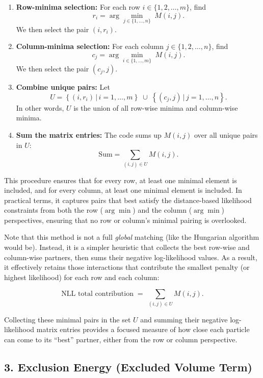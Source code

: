 \documentclass[12pt]{article}
\begin{document}
\begin{enumerate}
    \item \textbf{Row-minima selection:} For each row \(i \in \{1,2,\ldots,m\}\), find 
    \[
    r_i = \arg\min_{j \in \{1,\ldots,n\}} \; M(i,j).
    \]
    We then select the pair \((i, r_i)\).

    \item \textbf{Column-minima selection:} For each column \(j \in \{1,2,\ldots,n\}\), find 
    \[
    c_j = \arg\min_{i \in \{1,\ldots,m\}} \; M(i,j).
    \]
    We then select the pair \((c_j, j)\).

    \item \textbf{Combine unique pairs:} Let 
    \[
    U = \left\{(i, r_i)\,\big\vert\, i = 1,\ldots,m\right\} \;\cup\; 
         \left\{(c_j, j)\,\big\vert\, j = 1,\ldots,n\right\}.
    \]
    In other words, \(U\) is the union of all row-wise minima and column-wise minima.

    \item \textbf{Sum the matrix entries:} The code sums up \(M(i,j)\) over all unique pairs in \(U\):
    \[
    \text{Sum} = \sum_{(i,j) \in U} M(i,j).
    \]
\end{enumerate}

This procedure ensures that for every row, at least one minimal element is included, and for every column, at least one minimal element is included. In practical terms, it captures pairs that best satisfy the distance-based likelihood constraints from both the row (\(\arg\min\)) and the column (\(\arg\min\)) perspectives, ensuring that no row or column's minimal pairing is overlooked.

Note that this method is not a full \emph{global} matching (like the Hungarian algorithm would be). Instead, it is a simpler heuristic that collects the best row-wise and column-wise partners, then sums their negative log-likelihood values. As a result, it effectively retains those interactions that contribute the smallest penalty (or highest likelihood) for each row and each column:

\[
\text{NLL total contribution} \;=\;
\sum_{(i, j) \in U} M(i,j).
\]

Collecting these minimal pairs in the set \(U\) and summing their negative log-likelihood matrix entries provides a focused measure of how close each particle can come to its ``best'' partner, either from the row or column perspective.

\subsection*{3. Exclusion Energy (Excluded Volume Term)}
\end{document}
